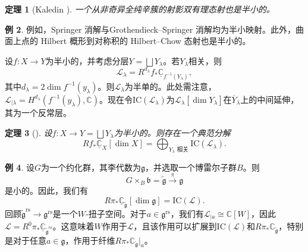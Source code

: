 \documentclass{amsart}
\newtheorem{thm}{定理}[section]
\theoremstyle{definition}
\newtheorem{exm}[thm]{例}
\theoremstyle{remark}
\theoremstyle{plain}
\theoremstyle{definition}
\theoremstyle{remark}
\newcommand{\C}{\mathbb{C}}
\newcommand{\g}{\mathfrak{g}}
\renewcommand{\b}{\mathfrak{b}}
\newcommand{\mc}[1]{\mathcal{#1}}
\newcommand{\mr}[1]{\mathrm{#1}}
\newcommand{\on}[1]{\operatorname{#1}}
\newcommand{\ol}[1]{\overline{#1}}
\newcommand{\ul}[1]{\underline{#1}}
\newcommand{\1}{\mathbf{1}}
\newcommand{\2}{\mathbf{2}}
\newcommand{\3}{\mathbf{3}}
\begin{document}
\begin{thm}[Kaledin {\cite{Kaledin2006}}]
    一个从非奇异全纯辛簇的射影双有理态射也是半小的。
\end{thm}

\begin{exm}
    例如，Springer 消解与Grothendieck--Springer 消解均为半小映射。此外，曲面上点的 Hilbert 概形到对称积的 Hilbert--Chow 态射也是半小的。
\end{exm}

设\(f \colon X \to Y\)为半小的，并考虑分层\(Y = \bigsqcup Y_{\lambda}\)。若\(Y_{\lambda}\)相关，则
\[ \mc{L}_{\lambda} = R^{d_{\lambda}} f_* \ul{\C}_{f^{-1}(Y_{\lambda})}, \]
其中\(d_{\lambda} = 2 \dim f^{-1} (y_{\lambda})\)。则\(\mc{L}_{\lambda}\)为半单的。此处需注意，\(\mc{L}_{|\lambda} = H^{d_{\lambda}}(f^{-1}(y_{\lambda}), \C)\)。现在令\(\mr{IC}(\mc{L}_{\lambda})\)为\(\mc{L}_{\lambda}[\dim Y_{\lambda}]\)在\(\ol{Y}_{\lambda}\)上的中间延伸，其为一个反常层。

\begin{thm}[{\cite{DeCataldoMigliorini2002}}]
设\(f \colon X \to Y = \bigsqcup Y_{\lambda}\)为半小的。则存在一个典范分解
    \[ R f_* \ul{\C}_X[\dim X] = \bigoplus_{Y_{\lambda}\text{ 相关}} \mr{IC}(\mc{L}_{\lambda}). \]
\end{thm}

\begin{exm}
设\(G\)为一个约化群，其李代数为\(\g\)，并选取一个博雷尔子群\(B\)。则
    \[ G \times_B \b = \tilde{\g} \xrightarrow{\pi} \g \]
是小的。因此，我们有
    \[ R \pi_* \ul{\C}_{\tilde{\g}} [\dim \g] = \mr{IC}(\mc{L}). \]
    回顾\(\tilde{\g}^{\on{rs}} \to \g^{\on{rs}}\)是一个\(W\)-扭子空间。对于\(a \in \g^{\on{rs}}\)，我们有\(\mc{L}_{|a} \cong \C[W]\)，因此\(\mc{L} = R^0 \pi_* \ul{\C}_{\tilde{\g}^{\on{rs}}}\)。这意味着\(W\)作用于\(\mc{L}\)，且该作用可以扩展到\(\mr{IC}(\mc{L})\)和\(R \pi_* \C_{\tilde{\g}}\)，特别是对于任意\(a \in \g\)，作用于纤维\(R \pi_* \C_{\tilde{\g}}|_a\)。
\end{exm}
\end{document}
